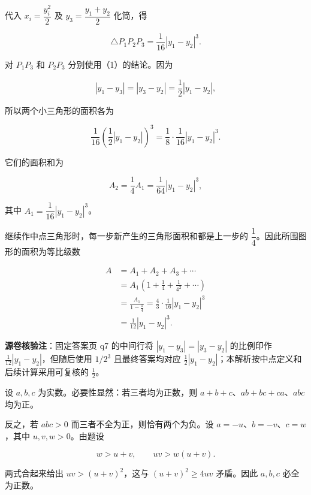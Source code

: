 \begin{answer}
代入 $x_i=\dfrac{y_i^2}{2}$ 及 $y_3=\dfrac{y_1+y_2}{2}$ 化简，得

\nopagebreak[4]
\[\triangle P_1P_2P_3=\frac1{16}|y_1-y_2|^3.\]


对 $P_1P_3$ 和 $P_2P_3$ 分别使用（1）的结论。因为

\nopagebreak[4]
\[|y_1-y_3|=|y_3-y_2|=\frac12|y_1-y_2|,\]

所以两个小三角形的面积各为

\nopagebreak[4]
\[\frac1{16}\left(\frac12|y_1-y_2|\right)^3=\frac18\cdot\frac1{16}|y_1-y_2|^3.\]

它们的面积和为

\nopagebreak[4]
\[A_2=\frac14A_1=\frac1{64}|y_1-y_2|^3,\]

其中 $A_1=\dfrac1{16}|y_1-y_2|^3$。


继续作中点三角形时，每一步新产生的三角形面积和都是上一步的 $\dfrac14$。因此所围图形的面积为等比级数

\nopagebreak[4]
\[\begin{aligned}
A&=A_1+A_2+A_3+\cdots\\
&=A_1\left(1+\frac14+\frac1{4^2}+\cdots\right)\\
&=\frac{A_1}{1-\frac14}=\frac43\cdot\frac1{16}|y_1-y_2|^3\\
&=\frac1{12}|y_1-y_2|^3.
\end{aligned}\]

\begin{gktip}
\textbf{源卷核验注}：固定答案页 q7 的中间行将 $|y_1-y_3|=|y_3-y_2|$ 的比例印作 $\frac1{12}|y_1-y_2|$，但随后使用 $1/2^3$ 且最终答案均对应 $\frac12|y_1-y_2|$；本解析按中点定义和后续计算采用可复核的 $\frac12$。
\end{gktip}


设 $a,b,c$ 为实数。必要性显然：若三者均为正数，则 $a+b+c$、$ab+bc+ca$、$abc$ 均为正。

反之，若 $abc>0$ 而三者不全为正，则恰有两个为负。设 $a=-u$、$b=-v$、$c=w$，其中 $u,v,w>0$。由题设

\nopagebreak[4]
\[w>u+v,\qquad uv>w(u+v).\]

两式合起来给出 $uv>(u+v)^2$，这与 $(u+v)^2\geqslant4uv$ 矛盾。因此 $a,b,c$ 必全为正数。


\end{answer}
